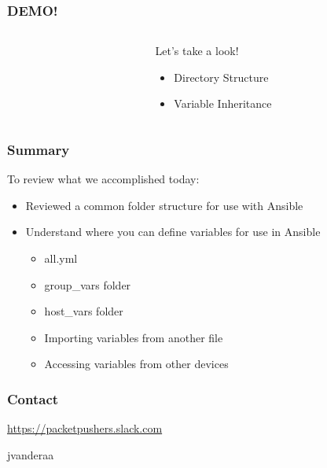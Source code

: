 \documentclass[aspectratio=169]{beamer}
\begin{document}
\begin{frame}
  \frametitle{DEMO!}
  \begin{columns}
  \begin{column}{0.3\textwidth}
    \Huge
    \begin{center}
      \faDesktop 
      \hspace{.5cm}
      \faRocket     
    \end{center}
  \end{column}
  \begin{column}{0.7\textwidth}
    \huge 
      Let's take a look!
      \begin{itemize}
        \item Directory Structure
        \item Variable Inheritance
      \end{itemize}
  \end{column}
  \end{columns}
\end{frame}

\begin{frame}
  \frametitle{Summary}
    To review what we accomplished today:
    \begin{itemize}
      \item <2-> Reviewed a common folder structure for use with Ansible
      \item <3-> Understand where you can define variables for use in Ansible
      \begin{itemize}
          \item <3-> all.yml
          \item <4-> group\_vars folder
          \item <5-> host\_vars folder
          \item <6-> Importing variables from another file
          \item <7-> Accessing variables from other devices
      \end{itemize}
    \end{itemize}
\end{frame}

\begin{frame}
    \frametitle{Contact}
    \huge
    \begin{center}
      \url{https://packetpushers.slack.com}
    \end{center}
    \begin{center}
      \normalsize
      \faSlack \hspace{.1cm}jvanderaa  
    \end{center}
  \end{frame}
\end{document}
